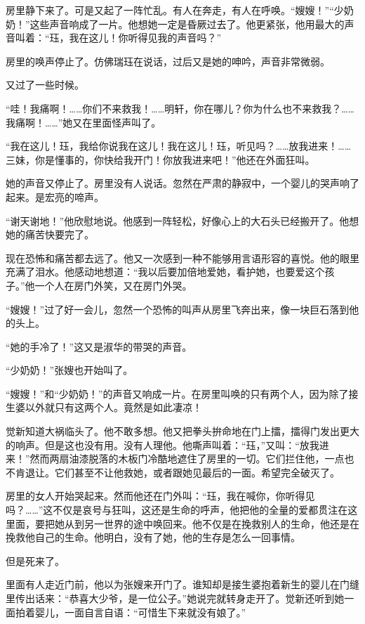 \par 房里静下来了。可是又起了一阵忙乱。有人在奔走，有人在呼唤。“嫂嫂！”“少奶奶！”这些声音响成了一片。他想她一定是昏厥过去了。他更紧张，他用最大的声音叫着：“珏，我在这儿！你听得见我的声音吗？”
\par 房里的唤声停止了。仿佛瑞珏在说话，过后又是她的呻吟，声音非常微弱。
\par 又过了一些时候。
\par “哇！我痛啊！……你们不来救我！……明轩，你在哪儿？你为什么也不来救我？……我痛啊！……”她又在里面怪声叫了。
\par “我在这儿！珏，我给你说我在这儿！我在这儿！珏，听见吗？……放我进来！……三妹，你是懂事的，你快给我开门！你放我进来吧！”他还在外面狂叫。
\par 她的声音又停止了。房里没有人说话。忽然在严肃的静寂中，一个婴儿的哭声响了起来。是宏亮的啼声。
\par “谢天谢地！”他欣慰地说。他感到一阵轻松，好像心上的大石头已经搬开了。他想她的痛苦快要完了。
\par 现在恐怖和痛苦都去远了。他又一次感到一种不能够用言语形容的喜悦。他的眼里充满了泪水。他感动地想道：“我以后要加倍地爱她，看护她，也要爱这个孩子。”他一个人在房门外笑，又在房门外哭。
\par “嫂嫂！”过了好一会儿，忽然一个恐怖的叫声从房里飞奔出来，像一块巨石落到他的头上。
\par “她的手冷了！”这又是淑华的带哭的声音。
\par “少奶奶！”张嫂也开始叫了。
\par “嫂嫂！”和“少奶奶！”的声音又响成一片。在房里叫唤的只有两个人，因为除了接生婆以外就只有这两个人。竟然是如此凄凉！
\par 觉新知道大祸临头了。他不敢多想。他又把拳头拚命地在门上擂，擂得门发出更大的响声。但是这也没有用。没有人理他。他嘶声叫着：“珏，”又叫：“放我进来！”然而两扇油漆脱落的木板门冷酷地遮住了房里的一切。它们拦住他，一点也不肯退让。它们甚至不让他救她，或者跟她见最后的一面。希望完全破灭了。
\par 房里的女人开始哭起来。然而他还在门外叫：“珏，我在喊你，你听得见吗？……”这不仅是哀号与狂叫，这还是生命的呼声，他把他的全量的爱都贯注在这里面，要把她从到另一世界的途中唤回来。他不仅是在挽救别人的生命，他还是在挽救他自己的生命。他明白，没有了她，他的生存是怎么一回事情。
\par 但是死来了。
\par 里面有人走近门前，他以为张嫂来开门了。谁知却是接生婆抱着新生的婴儿在门缝里传出话来：“恭喜大少爷，是一位公子。”她说完就转身走开了。觉新还听到她一面拍着婴儿，一面自言自语：“可惜生下来就没有娘了。”
